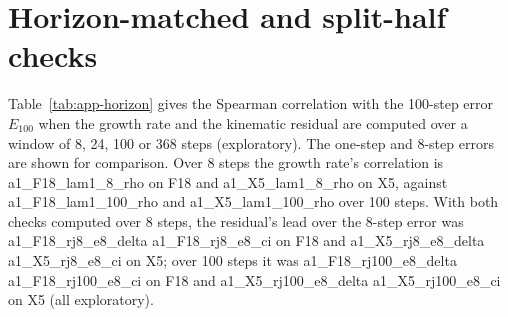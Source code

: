\FloatBarrier
\section{Horizon-matched and split-half checks}\label{app:A3}
Table~\ref{tab:app-horizon} gives the Spearman correlation with the 100-step error $E_{100}$ when the growth rate
and the kinematic residual are computed over a window of 8, 24, 100 or 368 steps (exploratory). The one-step and 8-step
errors are shown for comparison. Over 8 steps the growth rate's correlation is {{a1_F18_lam1_8_rho}} on F18 and
{{a1_X5_lam1_8_rho}} on X5, against {{a1_F18_lam1_100_rho}} and {{a1_X5_lam1_100_rho}} over 100 steps.
With both checks computed over 8 steps, the residual's lead over the 8-step error was {{a1_F18_rj8_e8_delta}}
{{a1_F18_rj8_e8_ci}} on F18 and {{a1_X5_rj8_e8_delta}} {{a1_X5_rj8_e8_ci}} on X5; over 100 steps it was
{{a1_F18_rj100_e8_delta}} {{a1_F18_rj100_e8_ci}} on F18 and {{a1_X5_rj100_e8_delta}} {{a1_X5_rj100_e8_ci}} on X5 (all exploratory).

\begin{table}[h]
\centering
\caption{Spearman correlation of each check with $E_{100}$ by the window the check is computed over, for F18 (4 held-out
trajectories; all simulators, trained, compressed) and X5 (20 trajectories) (exploratory).}
\label{tab:app-horizon}
\footnotesize
\setlength{\tabcolsep}{4pt}
\end{table}

